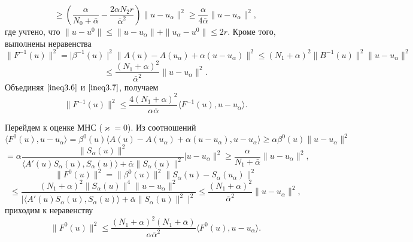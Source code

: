 \begin{equation}\label{ineq3.6}
\ge\left(\frac{\alpha}{N_0+\bar\alpha}-\frac{2\alpha N_2r}{\bar\alpha ^2}\right)\|u-u_\alpha\|^2\ge\frac{\alpha}{4\bar\alpha}\|u-u_\alpha\|^2,\end{equation}
где учтено, что $\|u-u^0\|\le\|u-u_\alpha\|+\|u_\alpha-u^0\|\le 2r.$ Кроме того, выполнены неравенства $$\|F^{-1}(u)\|^2=\mid\beta^{-1}(u)\mid^2\|A(u)-A(u_\alpha)+\alpha(u-u_\alpha)\|^2\le(N_1+\alpha)^2\|B^{-1}(u)\|^2\|u-u_\alpha\|^2 $$
\begin{equation}\label{ineq3.7}
\le\frac{(N_1+\alpha)^2}{\bar\alpha^2}\|u-u_\alpha\|^2 .
\end{equation}
Объединяя $\eqref{ineq3.6}$ и $\eqref{ineq3.7}$, получаем
\begin{equation}\label{ineq3.8}
\|F^{-1}(u)\|^2\le\frac{4(N_1+\alpha)^2}{\alpha\bar\alpha}\langle F^{-1}(u), u-u_\alpha\rangle.
\end{equation}

Перейдем к оценке МНС ($\varkappa=0$). Из соотношений
$$\langle F^0(u), u-u_\alpha\rangle=\beta^0(u)\langle A(u)-A(u_\alpha)+\alpha(u-u_\alpha), u-u_\alpha\rangle\ge\alpha\beta^0(u)\|u-u_\alpha\|^2$$ 
\begin{equation}\label{ineq3.9}
=\alpha\frac{\|S_\alpha (u)\|^2}{\langle A'(u)S_\alpha (u),S_\alpha (u)\rangle +\bar\alpha\|S_\alpha (u)\|^2}|u-u_\alpha\|^2\ge \frac{\alpha}{N_1+\bar\alpha}\|u-u_\alpha\|^2,\end{equation}
$$
\|F^0(u)\|^2=\|\beta^0(u)\|^2\|S_\alpha(u)-S_\alpha(u_\alpha)\|^2 $$
\begin{equation}\label{ineq3.10}\le\frac{(N_1+\alpha)^2\|S_\alpha (u)\|^4\|u-u_\alpha\|^2}{\mid\langle A'(u)S_\alpha (u),S_\alpha (u)\rangle +\bar\alpha\|S_\alpha (u)\|^2\mid ^2}\le\frac{(N_1+\alpha)^2}{\bar\alpha^2}\|u-u_\alpha\|^2,
\end{equation}
приходим к неравенству
$$\|F^0(u)\|^2\le\frac{(N_1+\alpha)^2(N_1+\bar\alpha)}{\alpha\bar\alpha^2}\langle F^0(u), u-u_\alpha\rangle.$$

